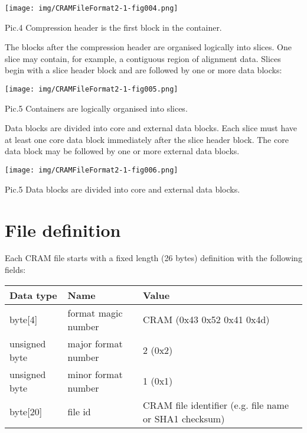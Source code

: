 \documentclass[a4paper]{article}
\begin{document}
\texttt{[image: img/CRAMFileFormat2-1-fig004.png]}

Pic.4 Compression header is the first block in the container.

The blocks after the compression header are organised logically into slices. One 
slice may contain, for example, a contiguous region of alignment data. Slices begin 
with a slice header block and are followed by one or more data blocks:

\texttt{[image: img/CRAMFileFormat2-1-fig005.png]}

Pic.5 Containers are logically organised into slices.

Data blocks are divided into core and external data blocks. Each slice must have 
at least one core data block immediately after the slice header block. The core 
data block may be followed by one or more external data blocks.

\texttt{[image: img/CRAMFileFormat2-1-fig006.png]}

Pic.5 Data blocks are divided into core and external data blocks. 

\section{\textbf{File definition}}

Each CRAM file starts with a fixed length (26 bytes) definition with the following 
fields:

\begin{tabular}{|l|l|l|}
\hline
\textbf{Data type} & \textbf{Name} & \textbf{Value}\tabularnewline
\hline
byte[4] & format magic number & CRAM (0x43 0x52 0x41 0x4d)\tabularnewline
\hline
unsigned byte & major format number & 2 (0x2)\tabularnewline
\hline
unsigned byte & minor format number & 1 (0x1)\tabularnewline
\hline
byte[20] & file id & CRAM file identifier (e.g. file name or SHA1 checksum)\tabularnewline
\hline
\end{tabular}
\end{document}
